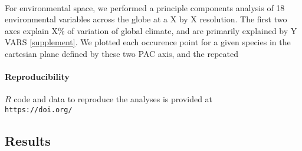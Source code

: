\documentclass[12pt]{article}
\begin{document}
\paragraph{} For environmental space, we performed a principle components analysis of 18 environmental variables across the globe at a X by X resolution. The first two axes explain X\% of variation of global climate, and are primarily explained by Y VARS \ref{supplement}. We plotted each occurence point for a given species in the cartesian plane defined by these two PAC axis, and the repeated








\paragraph*{Reproducibility}
$R$ code and data to reproduce the analyses is provided at \\
\texttt{https://doi.org/}























\subsection*{Results}


\paragraph*{}
\end{document}
